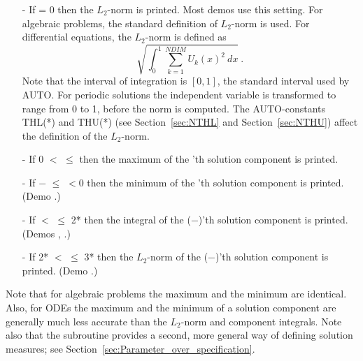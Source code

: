 \begin{itemize}
\item[-]
  If  = 0 then the $L_2$-norm is printed. Most demos use this setting.
  For algebraic problems, the standard definition of $L_2$-norm is used.
  For differential equations, the $L_2$-norm is defined as 
  $$ \sqrt{ \int_0^1 \sum_{k=1}^{NDIM} U_k(x)^2 ~ dx}~.$$
  Note that the interval of integration is $[0,1]$, the standard interval
 used by AUTO. For periodic solutions the independent variable is transformed
 to range from 0 to 1, before the norm is computed. The AUTO-constants THL(*) 
 and THU(*) (see Section~\ref{sec:NTHL} and Section~\ref{sec:NTHU})
 affect the definition of the $L_2$-norm.
\item[-]
  If 0 $<$  $\le$  then the maximum of the 'th solution component 
  is printed.
\item[-]
  If $-$ $\le$  $<$0 then the minimum of the 'th solution component
  is printed.  (Demo .)
\item[-]
  If  $<$  $\le$ 2* then the integral 
  of the ($-$)'th 
  solution component is printed. (Demos , .)
\item[-]
  If 2* $<$  $\le$ 3* 
  then the $L_2$-norm of the ($-$)'th 
  solution component is printed. (Demo .)
\end{itemize}

Note that for algebraic problems the maximum and the minimum are identical.
Also, for ODEs the maximum and the minimum of a solution component are generally
much less accurate than the $L_2$-norm and component integrals.
Note also that the subroutine  provides a second, more general way
of defining solution measures; see Section~\ref{sec:Parameter_over_specification}.


\subsection{}  \label{sec:NUZR} 

%
% 
% 

